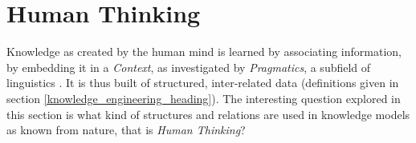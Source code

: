 %
%
%
%
%
%
%

\section{Human Thinking}
\label{human_thinking_heading}

Knowledge as created by the human mind is learned by associating information,
by embedding it in a \emph{Context}, as investigated by \emph{Pragmatics}, a
subfield of linguistics \cite{wikipedia}. It is thus built of structured,
inter-related data (definitions given in section
\ref{knowledge_engineering_heading}). The interesting question explored in this
section is what kind of structures and relations are used in knowledge models
as known from nature, that is \emph{Human Thinking}?






%


%

